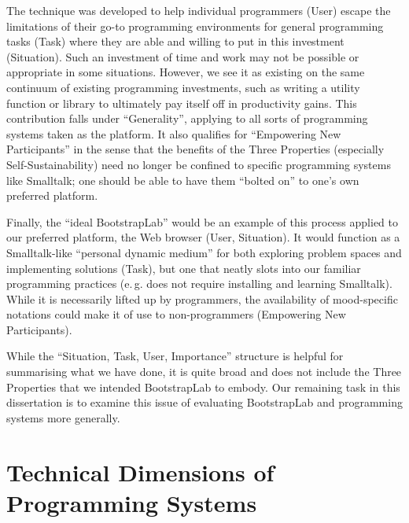\documentclass[ twoside,openright,titlepage,numbers=noenddot,headinclude,footinclude,cleardoublepage=empty,abstract=on,
                BCOR=5mm,paper=a4,fontsize=11pt
                ]{scrreprt}
\newcommand{\eg}{e.\,g.}
\theoremstyle{definition}
\begin{document}
The technique was developed to help individual programmers (User) escape
the limitations of their go-to programming environments for general
programming tasks (Task) where they are able and willing to put in this
investment (Situation). Such an investment of time and work may not be
possible or appropriate in some situations. However, we see it as
existing on the same continuum of existing programming investments, such
as writing a utility function or library to ultimately pay itself off in
productivity gains. This contribution falls under ``Generality'',
applying to all sorts of programming systems taken as the platform. It
also qualifies for ``Empowering New Participants'' in the sense that the
benefits of the Three Properties (especially Self-Sustainability) need
no longer be confined to specific programming systems like Smalltalk;
one should be able to have them ``bolted on'' to one's own preferred
platform.

Finally, the ``ideal BootstrapLab'' would be an example of this process
applied to our preferred platform, the Web browser (User, Situation). It
would function as a Smalltalk-like ``personal dynamic medium'' for both
exploring problem spaces and implementing solutions (Task), but one that
neatly slots into our familiar programming practices (\eg{} does not
require installing and learning Smalltalk). While it is necessarily
lifted up by programmers, the availability of mood-specific notations
could make it of use to non-programmers (Empowering New Participants).

While the ``Situation, Task, User, Importance'' structure is helpful for
summarising what we have done, it is quite broad and does not include
the Three Properties that we intended BootstrapLab to embody. Our
remaining task in this dissertation is to examine this issue of
evaluating BootstrapLab and programming systems more generally.
\clearpage{}
\cleardoublepage
\clearpage{}\hypertarget{tech-dims}{\chapter{Technical Dimensions of Programming Systems}\label{tech-dims}}
\end{document}
